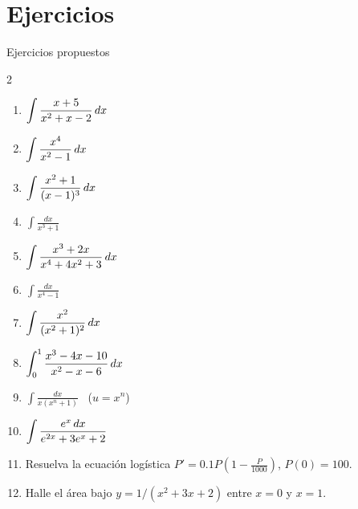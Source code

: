 \documentclass[10pt,aspectratio=169]{beamer}
\begin{document}
\section{Ejercicios}

\begin{frame}{Ejercicios propuestos}
  \begin{ejercicio}
    \begin{multicols}{2}
    \begin{enumerate}
      \item $\displaystyle\int\frac{x+5}{x^2+x-2}\,dx$
      \item $\displaystyle\int\frac{x^4}{x^2-1}\,dx$
      \item $\displaystyle\int\frac{x^2+1}{(x-1)^3}\,dx$
      \item $\displaystyle\int\frac{dx}{x^3+1}$
      \item $\displaystyle\int\frac{x^3+2x}{x^4+4x^2+3}\,dx$
      \item $\displaystyle\int\frac{dx}{x^4-1}$
      \item $\displaystyle\int\frac{x^2}{(x^2+1)^2}\,dx$
      \item $\displaystyle\int_0^1\frac{x^3-4x-10}{x^2-x-6}\,dx$
      \item $\displaystyle\int\frac{dx}{x(x^n+1)}$ \ ($u=x^n$)
      \item $\displaystyle\int\frac{e^x\,dx}{e^{2x}+3e^x+2}$
    \end{enumerate}
    \end{multicols}
  \end{ejercicio}
  \begin{ejercicio}[: aplicaciones]
    \begin{enumerate}
      \setcounter{enumi}{10}
      \item Resuelva la ecuación logística $P'=0.1P\left(1-\frac{P}{1000}\right)$, $P(0)=100$.
      \item Halle el área bajo $y=1/(x^2+3x+2)$ entre $x=0$ y $x=1$.
    \end{enumerate}
  \end{ejercicio}
\end{frame}
\end{document}
